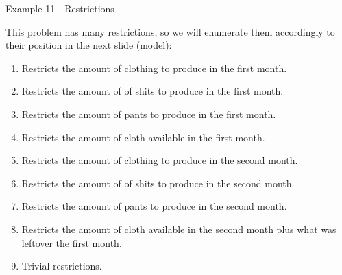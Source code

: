 \begin{frame}{Example 11 - Restrictions}

This problem has many restrictions, so we will enumerate them accordingly to
their position in the next slide (model):

\begin{enumerate}
\small
\item Restricts the amount of clothing to produce in the first month.
\item Restricts the amount of of shits to produce in the first month.
\item Restricts the amount of pants to produce in the first month.
\item Restricts the amount of cloth available in the first month.
\item Restricts the amount of clothing to produce in the second month.
\item Restricts the amount of of shits to produce in the second month.
\item Restricts the amount of pants to produce in the second month.
\item Restricts the amount of cloth available in the second month plus what was
      leftover the first month.
\item Trivial restrictions.
\end{enumerate}

\end{frame}
